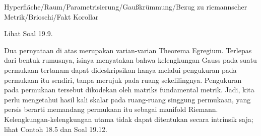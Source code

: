 {Hyperfläche/Raum/Parametrisierung/Gaußkrümmung/Bezug zu riemannscher Metrik/Brioschi/Fakt}
{Korollar}
{}
{

\faktzusatz {}
\faktzusatz {}

 }
{ Lihat Soal 19.9. }

Dua pernyataan di atas merupakan varian-varian Theorema Egregium. Terlepas dari bentuk rumusnya, isinya menyatakan bahwa kelengkungan Gauss pada suatu permukaan tertanam dapat dideskripsikan hanya melalui pengukuran pada permukaan itu sendiri, tanpa merujuk pada ruang sekelilingnya. Pengukuran pada permukaan tersebut dikodekan oleh matriks fundamental metrik. Jadi, kita perlu mengetahui hasil kali skalar pada ruang-ruang singgung permukaan, yang persis berarti memandang permukaan itu sebagai manifold Riemann. Kelengkungan-kelengkungan utama tidak dapat ditentukan secara intrinsik saja; lihat
Contoh 18.5
dan
Soal 19.12.
